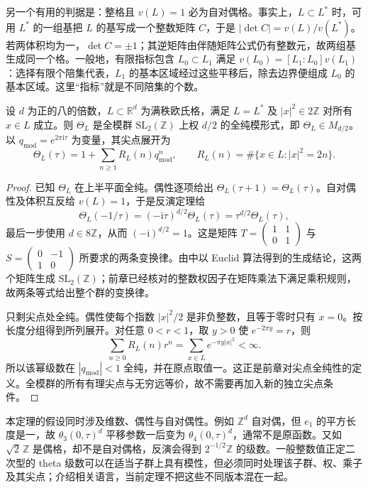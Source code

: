 \ProseParagraphBreak

另一个有用的判据是：整格且 \(v(L)=1\) 必为自对偶格。事实上，\(L\subset L^*\) 时，可用 \(L^*\) 的一组基把 \(L\) 的基写成一个整数矩阵 \(C\)，于是
\(|\det C|=v(L)/v(L^*)\)。若两体积均为一，\(\det C=\pm1\)；其逆矩阵由伴随矩阵公式仍有整数元，故两组基生成同一个格。一般地，有限指标包含 \(L_0\subset L_1\) 满足
\(v(L_0)=[L_1:L_0]v(L_1)\)：选择有限个陪集代表，\(L_1\) 的基本区域经过这些平移后，除去边界便组成 \(L_0\) 的基本区域。这里“指标”就是不同陪集的个数。

\begin{theorem}[偶自对偶格给出的模形式]\label{b3:thm:24-lattice-modularity}
设 \(d\) 为正的八的倍数，\(L\subset\mathbb R^d\) 为满秩欧氏格，满足
\(L=L^*\) 及 \(|x|^2\in2\mathbb Z\) 对所有 \(x\in L\) 成立。则
\(\Theta_L\) 是全模群 \(\mathrm{SL}_2(\mathbb Z)\) 上权 \(d/2\) 的全纯模形式，即 \(\Theta_L\in M_{d/2}\)。以 \(q_{\mathrm{mod}}=e^{2\pi\mathrm{i}\tau}\) 为变量，其尖点展开为
\[
 \Theta_L(\tau)=1+\sum_{n\ge1}R_L(n)q_{\mathrm{mod}}^n,\qquad
 R_L(n)=\#\{x\in L:|x|^2=2n\}.
\]
\end{theorem}
\begin{proof}
已知 \(\Theta_L\) 在上半平面全纯。偶性逐项给出
\(\Theta_L(\tau+1)=\Theta_L(\tau)\)。自对偶性及体积互反给 \(v(L)=1\)，于是反演定理给
\[
 \Theta_L(-1/\tau)=(-\mathrm{i}\tau)^{d/2}\Theta_L(\tau)
                 =\tau^{d/2}\Theta_L(\tau),
\]
最后一步使用 \(d\in8\mathbb Z\)，从而
\((-\mathrm{i})^{d/2}=1\)。这是矩阵
\(T=\left(\begin{smallmatrix}1&1\\0&1\end{smallmatrix}\right)\) 与
\(S=\left(\begin{smallmatrix}0&-1\\1&0\end{smallmatrix}\right)\)
所要求的两条变换律。由中以 Euclid 算法得到的生成结论，这两个矩阵生成 \(\mathrm{SL}_2(\mathbb Z)\)；前章已经核对的整数权因子在矩阵乘法下满足乘积规则，故两条等式给出整个群的变换律。

只剩尖点处全纯。偶性使每个指数 \(|x|^2/2\) 是非负整数，且等于零时只有 \(x=0\)。按长度分组得到所列展开。对任意 \(0<r<1\)，取 \(y>0\) 使 \(e^{-2\pi y}=r\)，则
\[
 \sum_{n\ge0}R_L(n)r^n
 =\sum_{x\in L}e^{-\pi y|x|^2}<\infty.
\]
所以该幂级数在 \(|q_{\mathrm{mod}}|<1\) 全纯，并在原点取值一。这正是前章对尖点全纯性的定义。全模群的所有有理尖点与无穷远等价，故不需要再加入新的独立尖点条件。
\end{proof}

本定理的假设同时涉及维数、偶性与自对偶性。例如 \(\mathbb Z^d\) 自对偶，但 \(e_1\) 的平方长度是一，故
\(\theta_3(0,\tau)^d\) 平移参数一后变为 \(\theta_4(0,\tau)^d\)，通常不是原函数。又如 \(\sqrt2\,\mathbb Z\) 是偶格，却不是自对偶格，反演会得到
\(2^{-1/2}\mathbb Z\) 的级数。一般整数值正定二次型的 theta 级数可以在适当子群上具有模性，但必须同时处理该子群、权、乘子及其尖点；介绍相关语言，当前定理不把这些不同版本混在一起。

